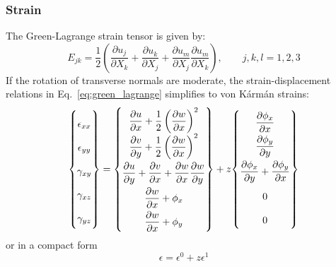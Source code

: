 \documentclass[12pt]{article}
\numberwithin{equation}{section}
\newcommand{\pdiff}[2]{ \frac{\partial #1}{ \partial #2} }
\newcommand{\dpdiff}[2]{ \dfrac{\partial #1}{ \partial #2} }
\begin{document}
\subsubsection{Strain}
The Green-Lagrange strain tensor is given by:
%
\begin{equation}
    E_{jk} = \frac{1}{2}
    \left(
    \pdiff{u_j}{X_k} +
    \pdiff{u_k}{X_j} +
    \pdiff{u_m}{X_j} \pdiff{u_m}{X_k}
    \right),
    \qquad j, k, l = 1, 2, 3
    \label{eq:green_lagrange}
\end{equation}
%
If the rotation of transverse normals are moderate, the strain-displacement relations in Eq.~\eqref{eq:green_lagrange} simplifies to von Kármán strains:
%
\begin{equation}
    \begin{Bmatrix}
        \epsilon_{xx} \\
        \epsilon_{yy} \\
        \gamma_{xy}   \\
        \gamma_{xz}   \\
        \gamma_{yz}   \\
    \end{Bmatrix} =
    {\renewcommand\arraystretch{2}
    \begin{Bmatrix}
        \dpdiff{u}{x} + \dfrac{1}{2} \left(\dpdiff{w}{x}\right)^2   \\
        \dpdiff{v}{y} + \dfrac{1}{2} \left(\dpdiff{w}{x}\right)^2   \\
        \dpdiff{u}{y} + \dpdiff{v}{x} + \dpdiff{w}{x} \dpdiff{w}{y} \\
        \dpdiff{w}{x} + \phi_x                                      \\
        \dpdiff{w}{x} + \phi_y                                      \\
    \end{Bmatrix}
    }
    + z
        {\renewcommand\arraystretch{2}
            \begin{Bmatrix}
                \dpdiff{\phi_x}{x}                      \\
                \dpdiff{\phi_y}{y}                      \\
                \dpdiff{\phi_x}{y} + \dpdiff{\phi_y}{x} \\
                0                                       \\
                0
            \end{Bmatrix}
        }
    \label{eq:strain_displacement}
\end{equation}
%
or in a compact form
\begin{equation}
    \epsilon = \epsilon^0 + z \epsilon^1
    \label{eq:strain_displacement_2}
\end{equation}
%
\end{document}
